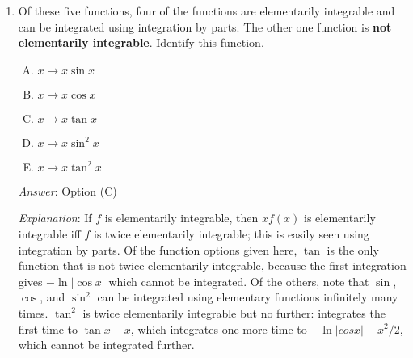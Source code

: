\documentclass[10pt]{amsart}
\begin{document}
\begin{enumerate}
  \begin{enumerate}[(A)]
  \item $1$
  \item $2$
  \item $3$
  \item $4$
  \item $5$
  \end{enumerate}

  {\em Answer}: Option (C)

  {\em Explanation}: Via the $u$-substitution $u = x^{1/k}$, we get
  $\int ku^{k-1}f(u) \, du$. Now using the previous question, the
  maximum value of $k - 1$ possible is $2$, so the maximum possible
  value is $3$.

  We can also do a direct integration by parts taking $1$ as the
  second part.

  {\em Note}: It is true that $f(x^{1/3})$ can be integrated and
  $f(x^{1/4})$ cannot. {\em A priori}, we cannot say whether
  $f(x^{1/5})$ can or cannot be integrated. It cannot be integrated
  {\em using the integration by parts approach}, but it may happen to
  be the case that they could be integrated by other methods, though
  this is rare in practical cases (and when that does happen, it is
  obvious).

  {\em Performance review}: $8$ out of $11$ got this. $2$ chose (D)
  and $1$ chose (B).

  {\em Historical note}: $14$ out of $27$ people got this correct. $4$
  people chose (D), $4$ people chose (B), $3$ people chose (A), $1$
  person chose (E), and $1$ person left the question blank.


\item Of these five functions, four of the functions are elementarily
  integrable and can be integrated using integration by parts. The
  other one function is  {\bf not
  elementarily integrable}. Identify this function.

  \begin{enumerate}[(A)]
  \item $x \mapsto x \sin x$
  \item $x \mapsto x \cos x$
  \item $x \mapsto x \tan x$
  \item $x \mapsto x \sin^2x$
  \item $x \mapsto x \tan^2x$
  \end{enumerate}

  {\em Answer}: Option (C)

  {\em Explanation}: If $f$ is elementarily integrable, then $xf(x)$
  is elementarily integrable iff $f$ is twice elementarily integrable;
  this is easily seen using integration by parts. Of the function
  options given here, $\tan$ is the only function that is not twice
  elementarily integrable, because the first integration gives
  $-\ln|\cos x|$ which cannot be integrated. Of the others, note that
  $\sin$, $\cos$, and $\sin^2$ can be integrated using elementary
  functions infinitely many times. $\tan^2$ is twice elementarily
  integrable but no further: integrates the first time to $\tan x -
  x$, which integrates one more time to $-\ln|cos x| - x^2/2$, which
  cannot be integrated further.


\end{enumerate}
\end{document}

